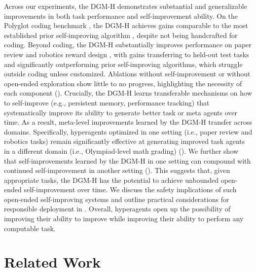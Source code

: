 \documentclass{article}
\begin{document}
Across our experiments, the DGM-H demonstrates substantial and generalizable improvements in both task performance and self-improvement ability. On the Polyglot coding benchmark \citep{gauthier2024polyglot}, the DGM-H achieves gains comparable to the most established prior self-improving algorithm \citep[the Darwin G\"odel Machine,][]{zhang2025darwin}, despite not being handcrafted for coding. Beyond coding, the DGM-H substantially improves performance on paper review \citep{zhao2026apres} and robotics reward design \citep{genesis2024}, with gains transferring to held-out test tasks and significantly outperforming prior self-improving algorithms, which struggle outside coding unless customized. Ablations without self-improvement or without open-ended exploration show little to no progress, highlighting the necessity of each component (). Crucially, the DGM-H learns transferable mechanisms on how to self-improve (e.g., persistent memory, performance tracking) that systematically improve its ability to generate better task or meta agents over time. As a result, meta-level improvements learned by the DGM-H transfer across domains. Specifically, hyperagents optimized in one setting (i.e., paper review and robotics tasks) remain significantly effective at generating improved task agents in a different domain (i.e., Olympiad-level math grading) (). We further show that self-improvements learned by the DGM-H in one setting can compound with continued self-improvement in another setting (). This suggests that, given appropriate tasks, the DGM-H has the potential to achieve unbounded open-ended self-improvement over time.
We discuss the safety implications of such open-ended self-improving systems and outline practical considerations for responsible deployment in . Overall, hyperagents open up the possibility of improving their ability to improve while improving their ability to perform any computable task.

\vspace{-0.5em}
\section{Related Work}
\label{sec:related-work}
\vspace{-0.5em}
\end{document}
